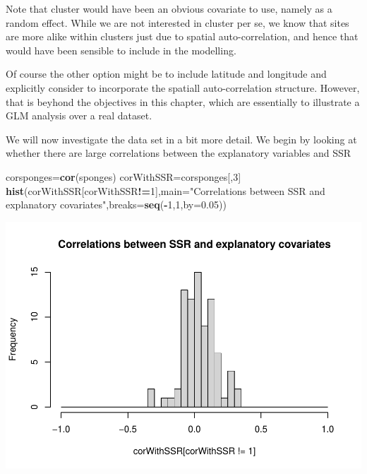 \documentclass[
]{book}
\newenvironment{Shaded}{\begin{snugshade}}{\end{snugshade}}
\newcommand{\AttributeTok}[1]{\textcolor[rgb]{0.13,0.29,0.53}{#1}}
\newcommand{\DecValTok}[1]{\textcolor[rgb]{0.00,0.00,0.81}{#1}}
\newcommand{\FloatTok}[1]{\textcolor[rgb]{0.00,0.00,0.81}{#1}}
\newcommand{\FunctionTok}[1]{\textcolor[rgb]{0.13,0.29,0.53}{\textbf{#1}}}
\newcommand{\NormalTok}[1]{#1}
\newcommand{\OtherTok}[1]{\textcolor[rgb]{0.56,0.35,0.01}{#1}}
\newcommand{\SpecialCharTok}[1]{\textcolor[rgb]{0.81,0.36,0.00}{\textbf{#1}}}
\newcommand{\StringTok}[1]{\textcolor[rgb]{0.31,0.60,0.02}{#1}}
\begin{document}
Note that cluster would have been an obvious covariate to use, namely as a random effect. While we are not interested in cluster per se, we know that sites are more alike within clusters just due to spatial auto-correlation, and hence that would have been sensible to include in the modelling.

Of course the other option might be to include latitude and longitude and explicitly consider to incorporate the spatiall auto-correlation structure. However, that is beyhond the objectives in this chapter, which are essentially to illustrate a GLM analysis over a real dataset.

We will now investigate the data set in a bit more detail. We begin by looking at whether there are large correlations between the explanatory variables and SSR

\begin{Shaded}
\begin{Highlighting}[]
\NormalTok{corsponges}\OtherTok{=}\FunctionTok{cor}\NormalTok{(sponges)}
\NormalTok{corWithSSR}\OtherTok{=}\NormalTok{corsponges[,}\DecValTok{3}\NormalTok{]}
\FunctionTok{hist}\NormalTok{(corWithSSR[corWithSSR}\SpecialCharTok{!=}\DecValTok{1}\NormalTok{],}\AttributeTok{main=}\StringTok{"Correlations between SSR and explanatory covariates"}\NormalTok{,}\AttributeTok{breaks=}\FunctionTok{seq}\NormalTok{(}\SpecialCharTok{{-}}\DecValTok{1}\NormalTok{,}\DecValTok{1}\NormalTok{,}\AttributeTok{by=}\FloatTok{0.05}\NormalTok{))}
\end{Highlighting}
\end{Shaded}

\includegraphics{ECOMODbook_files/figure-latex/unnamed-chunk-67-1.pdf}
\end{document}
